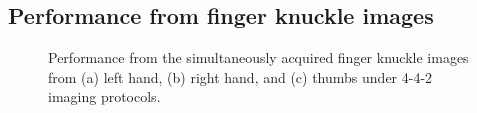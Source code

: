 \subsection{Performance from finger knuckle images\label{fk-performance}}

\begin{figure}[ht]
    \centering

    \caption{Performance from the simultaneously acquired finger knuckle images from (a) left hand, (b) right hand, and (c) thumbs under 4-4-2 imaging protocols.}
    \label{fingerknuckle-performance}
\end{figure}

